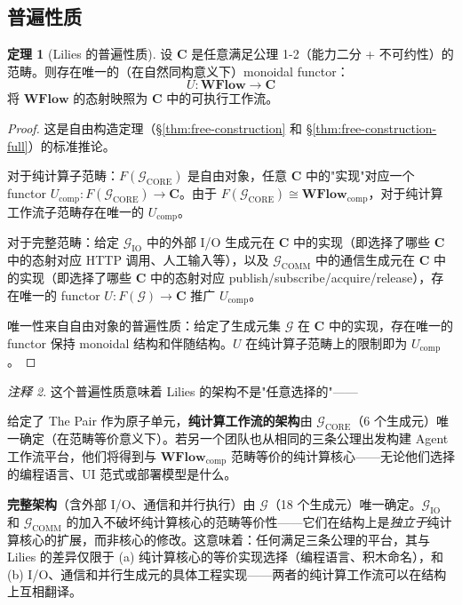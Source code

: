 \documentclass[11pt,a4paper]{article}
\theoremstyle{definition}
\newtheorem{theorem}{定理}[section]
\theoremstyle{definition}
\theoremstyle{remark}
\newtheorem{remark}[theorem]{注释}
\newcommand{\cat}[1]{\mathbf{#1}}
\newcommand{\catWFlow}{\cat{WFlow}}
\newcommand{\functor}[3]{#1: #2 \to #3}
\begin{document}
\subsection{普遍性质}

\begin{theorem}[Lilies 的普遍性质]
设 $\cat{C}$ 是任意满足公理 1-2（能力二分 + 不可约性）的范畴。则存在唯一的（在自然同构意义下）monoidal functor：
\[
\functor{U}{\catWFlow}{\cat{C}}
\]
将 $\catWFlow$ 的态射映照为 $\cat{C}$ 中的可执行工作流。
\label{thm:universal-property}
\end{theorem}

\begin{proof}
这是自由构造定理（\S\ref{thm:free-construction} 和 \S\ref{thm:free-construction-full}）的标准推论。

对于纯计算子范畴：$F(\mathcal{G}_{\mathrm{CORE}})$ 是自由对象，任意 $\cat{C}$ 中的"实现"对应一个 functor $U_{\mathrm{comp}}: F(\mathcal{G}_{\mathrm{CORE}}) \to \cat{C}$。由于 $F(\mathcal{G}_{\mathrm{CORE}}) \cong \catWFlow_{\mathrm{comp}}$，对于纯计算工作流子范畴存在唯一的 $U_{\mathrm{comp}}$。

对于完整范畴：给定 $\mathcal{G}_{\mathrm{IO}}$ 中的外部 I/O 生成元在 $\cat{C}$ 中的实现（即选择了哪些 $\cat{C}$ 中的态射对应 HTTP 调用、人工输入等），以及 $\mathcal{G}_{\mathrm{COMM}}$ 中的通信生成元在 $\cat{C}$ 中的实现（即选择了哪些 $\cat{C}$ 中的态射对应 publish/subscribe/acquire/release），存在唯一的 functor $U: F(\mathcal{G}) \to \cat{C}$ 推广 $U_{\mathrm{comp}}$。

唯一性来自自由对象的普遍性质：给定了生成元集 $\mathcal{G}$ 在 $\cat{C}$ 中的实现，存在唯一的 functor 保持 monoidal 结构和伴随结构。$U$ 在纯计算子范畴上的限制即为 $U_{\mathrm{comp}}$。
\end{proof}

\begin{remark}
这个普遍性质意味着 Lilies 的架构不是"任意选择的"——

给定了 The Pair 作为原子单元，\textbf{纯计算工作流的架构}由 $\mathcal{G}_{\mathrm{CORE}}$（6 个生成元）唯一确定（在范畴等价意义下）。若另一个团队也从相同的三条公理出发构建 Agent 工作流平台，他们将得到与 $\catWFlow_{\mathrm{comp}}$ 范畴等价的纯计算核心——无论他们选择的编程语言、UI 范式或部署模型是什么。

\textbf{完整架构}（含外部 I/O、通信和并行执行）由 $\mathcal{G}$（18 个生成元）唯一确定。$\mathcal{G}_{\mathrm{IO}}$ 和 $\mathcal{G}_{\mathrm{COMM}}$ 的加入不破坏纯计算核心的范畴等价性——它们在结构上是\emph{独立于}纯计算核心的扩展，而非核心的修改。这意味着：任何满足三条公理的平台，其与 Lilies 的差异仅限于 (a) 纯计算核心的等价实现选择（编程语言、积木命名），和 (b) I/O、通信和并行生成元的具体工程实现——两者的纯计算工作流可以在结构上互相翻译。
\end{remark}
\end{document}
